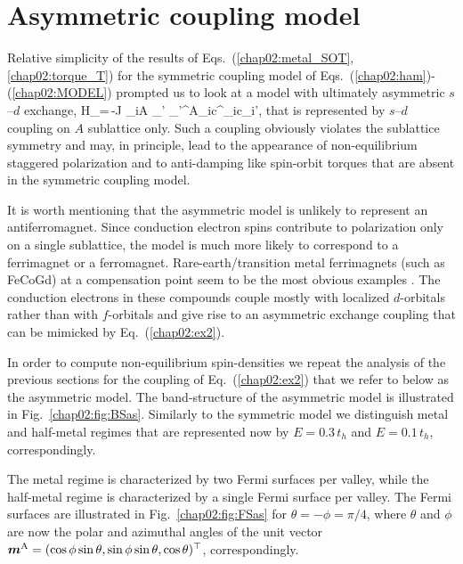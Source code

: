 \section{Asymmetric coupling model} 

Relative simplicity of the results of Eqs.~(\ref{chap02:metal_SOT},\ref{chap02:torque_T}) for the symmetric coupling model of Eqs.~(\ref{chap02:ham})-(\ref{chap02:MODEL}) prompted us to look at a model with ultimately asymmetric $s$--$d$ exchange,
\be
H_=\,-J \s_{i\in A }  \s_{\sigma\sigma'} \bb{\sigma}_{\sigma\sigma'}^\textrm{A}_i\cdot c^\dagger_{i\sigma}c\0_{i\sigma'},
\label{chap02:ex2}
\e
that is represented by $s$--$d$ coupling on $A$ sublattice only. Such a coupling obviously violates the sublattice symmetry and may, in principle, lead to the appearance of non-equilibrium staggered polarization and to anti-damping like spin-orbit torques that are absent in the symmetric coupling model. 

It is worth mentioning that the asymmetric model is unlikely to represent an antiferromagnet. Since conduction electron spins contribute to polarization only on a single sublattice, the model is much more likely to correspond to a ferrimagnet or a ferromagnet.  Rare-earth/transition metal ferrimagnets (such as FeCoGd) at a compensation point seem to be the most obvious examples \cite{jungfleisch_perspectives_2018}. The conduction electrons in these compounds couple mostly with localized $d$-orbitals rather than with $f$-orbitals and give rise to an asymmetric exchange coupling that can be mimicked by Eq.~(\ref{chap02:ex2}). 

In order to compute non-equilibrium spin-densities we repeat the analysis of the previous sections for the coupling of Eq.~(\ref{chap02:ex2}) that we refer to below as the asymmetric model. The band-structure of the asymmetric model is illustrated in Fig.~\ref{chap02:fig:BSas}. Similarly to the symmetric model we distinguish metal and half-metal regimes that are represented now by $E=0.3\,t_h$ and $E=0.1\,t_h$, correspondingly. 

The metal regime is characterized by two Fermi surfaces per valley, while the half-metal regime is characterized by a single Fermi surface per valley. The Fermi surfaces are illustrated in Fig.~\ref{chap02:fig:FSas} for $\theta=-\phi=\pi/4$, where $\theta$ and $\phi$ are now the polar and azimuthal angles of the unit vector $\boldsymbol{m}^\textrm{A}=(\cos\phi\sin\theta,\sin\phi\sin\theta,\cos\theta)^\top$, correspondingly. 

